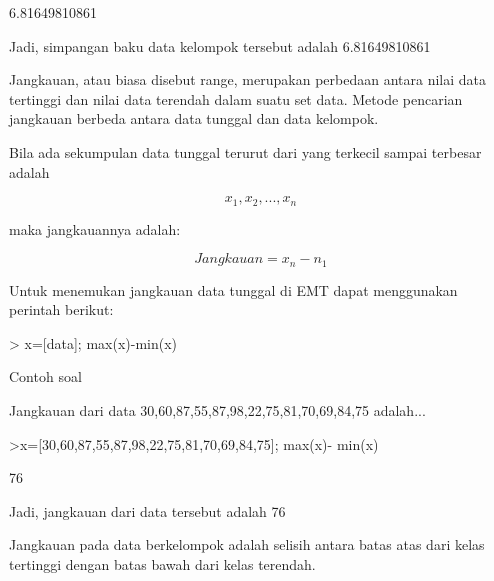 \documentclass[a4paper,10pt]{article}
\begin{document}
\begin{eulernotebook}
\begin{eulercomment}
\begin{eulercomment}
\begin{eulercomment}
\begin{eulercomment}
\begin{eulercomment}
\begin{eulercomment}
\begin{eulercomment}
\begin{eulercomment}
\begin{eulercomment}
\begin{eulercomment}
\begin{eulercomment}
\begin{eulercomment}
\begin{euleroutput}
  6.81649810861
\end{euleroutput}
\begin{eulercomment}
Jadi, simpangan baku data kelompok tersebut adalah 6.81649810861

\end{eulercomment}
\begin{eulercomment}
Jangkauan, atau biasa disebut range, merupakan perbedaan antara nilai
data tertinggi dan nilai data terendah dalam suatu set data. Metode
pencarian jangkauan berbeda antara data tunggal dan data kelompok.

\end{eulercomment}
\begin{eulercomment}
Bila ada sekumpulan data tunggal terurut dari yang terkecil sampai
terbesar adalah

\end{eulercomment}
\begin{eulerformula}
\[
x_1, x_2,..., x_n
\]
\end{eulerformula}
\begin{eulercomment}
maka jangkauannya adalah:

\end{eulercomment}
\begin{eulerformula}
\[
Jangkauan = x_n-n_1
\]
\end{eulerformula}
\begin{eulercomment}
Untuk menemukan jangkauan data tunggal di EMT dapat menggunakan
perintah berikut:

\textgreater{} x=[data]; max(x)-min(x)

Contoh soal

Jangkauan dari data 30,60,87,55,87,98,22,75,81,70,69,84,75 adalah...
\end{eulercomment}
\begin{eulerprompt}
>x=[30,60,87,55,87,98,22,75,81,70,69,84,75]; max(x)- min(x)
\end{eulerprompt}
\begin{euleroutput}
  76
\end{euleroutput}
\begin{eulercomment}
Jadi, jangkauan dari data tersebut adalah 76

\end{eulercomment}
\begin{eulercomment}
Jangkauan pada data berkelompok adalah selisih antara batas atas dari
kelas tertinggi dengan batas bawah dari kelas terendah.


\end{eulercomment}
\end{eulercomment}
\end{eulercomment}
\end{eulercomment}
\end{eulercomment}
\end{eulercomment}
\end{eulercomment}
\end{eulercomment}
\end{eulercomment}
\end{eulercomment}
\end{eulercomment}
\end{eulercomment}
\end{eulercomment}
\end{eulernotebook}
\end{document}
